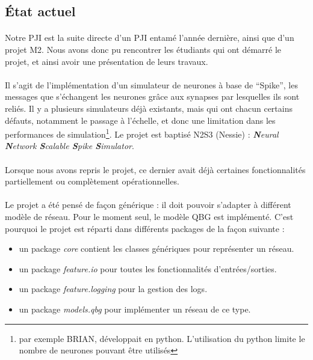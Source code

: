 \documentclass[a4paper,10pt]{article}
\begin{document}
\newpage

\subsection{État actuel}

\paragraph{}
Notre PJI est la suite directe d’un PJI entamé l’année dernière, ainsi que d’un projet M2. Nous avons donc pu rencontrer les étudiants qui ont démarré le projet, et ainsi avoir une présentation de leurs travaux.

\paragraph{}
Il s’agit de l’implémentation d’un simulateur de neurones à base de “Spike”, les messages que s’échangent les neurones grâce aux synapses par lesquelles ils sont reliés. Il y a plusieurs simulateurs déjà existants, mais qui  ont chacun certains défauts, notamment le passage à l’échelle, et donc une limitation dans les performances de simulation\footnote{par exemple BRIAN, développait en python. L'utilisation du python limite le nombre de neurones pouvant être utilisés}. Le projet est baptisé N2S3 (Nessie) : \emph{\textbf{N}eural \textbf{N}etwork \textbf{S}calable
\textbf{S}pike \textbf{S}imulator}.

\paragraph{}
Lorsque nous avons repris le projet, ce dernier avait déjà certaines fonctionnalités partiellement ou complètement opérationnelles.

\paragraph{}
Le projet a été pensé de façon générique : il doit pouvoir s’adapter à différent modèle de réseau. Pour le moment seul, le modèle QBG est implémenté. C’est pourquoi le projet est réparti dans différents packages de la façon suivante :

\begin{itemize}
	\item un package \emph{core} contient les classes génériques pour représenter un réseau.
	\item un package \emph{feature.io} pour toutes les fonctionnalités d’entrées/sorties.
	\item un package \emph{feature.logging} pour la gestion des logs.
	\item un package \emph{models.qbg} pour implémenter un réseau de ce type.
\end{itemize}
\end{document}
